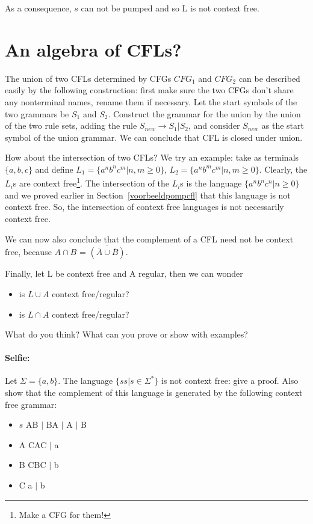 As a consequence, $s$ can not be pumped and so L is not context free.


\clearpage
\section{An algebra of CFLs?}

The union of two CFLs determined by CFGs $CFG_1$ and $CFG_2$ can be
described easily by the following construction: first make sure the two CFGs don't share any nonterminal names, rename them if necessary. Let the start symbols of the two
grammars be $S_1$ and $S_2$. Construct the grammar for the union by
the union of the two rule sets, adding the rule $S_{new} \rightarrow
S_1 | S_2$, and consider $S_{new}$ as the start symbol of the union
grammar. We can conclude that CFL is closed under union.

How about the intersection of two CFLs? We try an example: take as
terminals $\{a,b,c\}$ and define $L_1 = \{a^nb^nc^m|n,m \geq 0\}$,
$L_2 = \{a^nb^mc^m|n,m \geq 0\}$. Clearly, the $L_i$s are context
free\footnote{Make a CFG for them!}. The intersection of the $L_i$s is
the language $\{a^nb^nc^n|n \geq 0\}$ and we proved earlier in
Section~\ref{voorbeeldpompcfl} that this language is not context
free. So, the intersection of context free languages is not
necessarily context free.

We can now also conclude that the complement of a CFL need not be
context free, because
%
$A \cap B$ = $\overline{(\overline{A} \cup \overline{B})}$.

Finally, let L be context free and A regular, then we can wonder

\begin{itemize}
\item is $L \cup A$ context free/regular?
\item is $L \cap A$ context free/regular?
\end{itemize}

What do you think? What can you prove or show with examples?

\paragraph{Selfie:} Let $\Sigma = \{a,b\}$.
The language $\{ss|s \in \Sigma^*\}$ is not context free: give a
proof. Also show that the \label{zelfdoen1} complement of this
language is generated by the following context free grammar:
\begin{itemize}
\item $s$ \rpijl AB $|$ BA $|$ A $|$ B
\item A \rpijl CAC $|$ a
\item B \rpijl CBC $|$ b
\item C \rpijl a $|$ b
\end{itemize}

